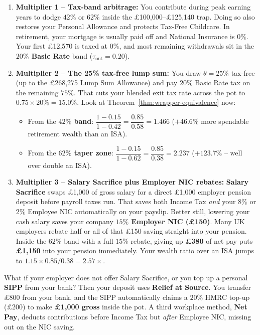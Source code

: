 \begin{enumerate}
  \item \textbf{Multiplier 1 -- Tax-band arbitrage:} You contribute during peak earning years to dodge $42\%$ or \textbf{$62\%$} inside the \pounds 100,000--\pounds 125,140 trap. Doing so also restores your Personal Allowance and protects Tax-Free Childcare. In retirement, your mortgage is usually paid off and National Insurance is $0\%$. Your first \pounds 12,570 is taxed at $0\%$, and most remaining withdrawals sit in the \textbf{$20\%$ Basic Rate} band ($\tau_{\text{out}} = 0.20$).
  \item \textbf{Multiplier 2 -- The 25\% tax-free lump sum:} You draw $\theta = 25\%$ tax-free (up to the \pounds 268,275 Lump Sum Allowance) and pay $20\%$ Basic Rate tax on the remaining $75\%$. That cuts your blended exit tax rate across the pot to $0.75 \times 20\% = \mathbf{15.0\%}$. Look at Theorem~\ref{thm:wrapper-equivalence} now:
  \begin{itemize}
    \item From the \textbf{$42\%$ band}: $\dfrac{1 - 0.15}{1 - 0.42} = \dfrac{0.85}{0.58} = \mathbf{1.466}$ (\textbf{$+46.6\%$} more spendable retirement wealth than an ISA).
    \item From the \textbf{$62\%$ taper zone}: $\dfrac{1 - 0.15}{1 - 0.62} = \dfrac{0.85}{0.38} = \mathbf{2.237}$ (\textbf{$+123.7\%$} -- well over double an ISA).
  \end{itemize}
  \item \textbf{Multiplier 3 -- Salary Sacrifice plus Employer NIC rebates:} \textbf{Salary Sacrifice} swaps \pounds 1,000 of gross salary for a direct \pounds 1,000 employer pension deposit before payroll taxes run. That saves both Income Tax \emph{and} your $8\%$ or $2\%$ Employee NIC automatically on your payslip. Better still, lowering your cash salary saves your company \textbf{$15\%$ Employer NIC (\pounds 150)}. Many UK employers rebate half or all of that \pounds 150 saving straight into your pension. Inside the $62\%$ band with a full $15\%$ rebate, giving up \textbf{\pounds 380} of net pay puts \textbf{\pounds 1,150} into your pension immediately. Your wealth ratio over an ISA jumps to $1.15 \times 0.85 / 0.38 = \mathbf{2.57\times}$.
\end{enumerate}

What if your employer does not offer Salary Sacrifice, or you top up a personal \textbf{SIPP} from your bank? Then your deposit uses \textbf{Relief at Source}. You transfer \pounds 800 from your bank, and the SIPP automatically claims a $20\%$ HMRC top-up (\pounds 200) to make \textbf{\pounds 1,000 gross} inside the pot. A third workplace method, \textbf{Net Pay}, deducts contributions before Income Tax but \emph{after} Employee NIC, missing out on the NIC saving.

